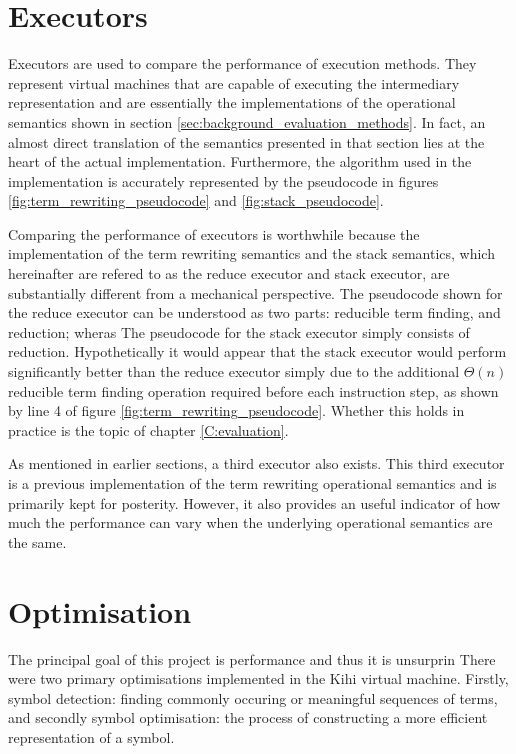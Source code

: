 


\section{Executors}\label{sec:implementation_executors}
Executors are used to compare the performance of execution methods.
They represent virtual machines that are capable of executing the intermediary representation and are essentially the implementations of the operational semantics shown in section \ref{sec:background_evaluation_methods}. In fact, an almost direct translation of the semantics presented in that section lies at the heart of the actual implementation. Furthermore, the algorithm used in the implementation is accurately represented by the pseudocode in figures \ref{fig:term_rewriting_pseudocode} and \ref{fig:stack_pseudocode}. 

Comparing the performance of executors is worthwhile because the implementation of the term rewriting semantics and the stack semantics, which hereinafter are refered to as the reduce executor and stack executor, are substantially different from a mechanical perspective. The pseudocode shown for the reduce executor can be understood as two parts: reducible term finding, and reduction; wheras The pseudocode for the stack executor simply consists of reduction.  Hypothetically it would appear that the stack executor would perform significantly better than the reduce executor simply due to the additional $\Theta(n)$ reducible term finding operation required before each instruction step, as shown by line 4 of figure \ref{fig:term_rewriting_pseudocode}. Whether this holds in practice is the topic of chapter \ref{C:evaluation}.

As mentioned in earlier sections, a third executor also exists. This third executor is a previous implementation of the term rewriting operational semantics and is primarily kept for posterity. However, it also provides an useful indicator of how much the performance can vary when the underlying operational semantics are the same.


\section{Optimisation}\label{sec:implementation_optimisation}
The principal goal of this project is performance and thus it is unsurprin
There were two primary optimisations implemented in the Kihi virtual
machine. Firstly, symbol detection: finding commonly occuring or
meaningful sequences of terms, and secondly symbol optimisation: the
process of constructing a more efficient representation of a symbol.


